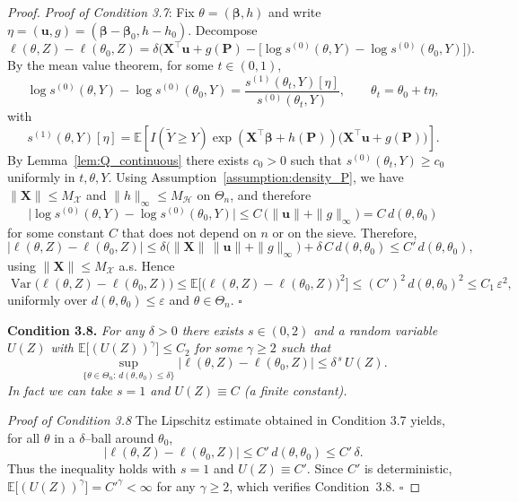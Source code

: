 \documentclass[11pt]{article}
\DeclareMathOperator{\Var}{Var}
\newcommand{\E}{\mathbb{E}}
\newenvironment{condition}[1]
  {\par\medskip\noindent\textbf{Condition #1.}\itshape}
  {\medskip}
\begin{document}
\begin{proof}
		\noindent\textit{Proof of Condition 3.7}:
		Fix $\theta=(\bm\beta,h)$ and write
		$\eta=(\bm u,g)=(\bm\beta-\bm\beta_0,h-h_0)$.
		Decompose
		\[
		\ell(\theta,Z)-\ell(\theta_0,Z)
		=\delta\Big(\bm X^\top\bm u+g(\bm P)
		-\big[\log s^{(0)}(\theta,Y)-\log s^{(0)}(\theta_0,Y)\big]\Big).
		\]
		By the mean value theorem, for some $t\in(0,1)$,
		\[
		\log s^{(0)}(\theta,Y)-\log s^{(0)}(\theta_0,Y)
		=\frac{s^{(1)}(\theta_t,Y)[\eta]}{s^{(0)}(\theta_t,Y)},
		\qquad \theta_t=\theta_0+t\eta,
		\]
		with
		\[
		s^{(1)}(\theta,Y)[\eta]
		=\E\!\left[I(\tilde Y\!\ge Y)\exp(\bm X^\top\bm\beta+h(\bm P))
		\big(\bm X^\top\bm u+g(\bm P)\big)\right].
		\]
		By Lemma~\ref{lem:Q_continuous} there exists $c_0>0$ such that
		$s^{(0)}(\theta_t,Y)\ge c_0$ uniformly in $t,\theta,Y$.
		Using Assumption~\ref{assumption:density_P}, we have $\|\bm X\|\le M_{\mathcal X}$
		and $\|h\|_\infty\le M_{\mathcal H}$ on $\Theta_n$, and therefore 	\[
		\Big|\log s^{(0)}(\theta,Y)-\log s^{(0)}(\theta_0,Y)\Big|
		\le C\,\big(\|\bm u\|+\|g\|_\infty\big)
		= C\, d(\theta,\theta_0)
		\]
		for some constant $C$ that does not depend on $n$ or on the sieve.
		Therefore,
		\[
		\big|\ell(\theta,Z)-\ell(\theta_0,Z)\big|
		\le \delta\Big(\|\bm X\|\,\|\bm u\|+\|g\|_\infty\Big)+
		\delta\,C\,d(\theta,\theta_0)
		\le C'\,d(\theta,\theta_0),
		\]
		using $\|\bm X\|\le M_{\mathcal X}$ a.s.
		Hence
		\[
		\Var\!\bigl(\ell(\theta,Z)-\ell(\theta_0,Z)\bigr)
		\le \E\bigl[\big(\ell(\theta,Z)-\ell(\theta_0,Z)\big)^2\bigr]
		\le (C')^2\, d(\theta,\theta_0)^2
		\le C_1\,\varepsilon^2 ,
		\]
		uniformly over $d(\theta,\theta_0)\le\varepsilon$ and $\theta\in\Theta_n$. \hfill $\square$
		
		
		\begin{condition}{3.8} For any $\delta>0$ there exists $s\in(0,2)$ and a random variable $U(Z)$ with $\E\big[(U(Z))^\gamma\big]\le C_2$ for some $\gamma\ge2$ such that
		\[
		\sup_{\{\theta\in\Theta_n:\, d(\theta,\theta_0)\le\delta\}}
		\big|\ell(\theta,Z)-\ell(\theta_0,Z)\big|
		\le \delta^{\,s}\, U(Z).
		\]
		In fact we can take $s=1$ and $U(Z)\equiv C$ (a finite constant).
		\end{condition}

		\noindent\textit{Proof of Condition 3.8} The Lipschitz estimate obtained in Condition 3.7 yields, for all $\theta$ in a $\delta$–ball around $\theta_0$,
		\[
		\big|\ell(\theta,Z)-\ell(\theta_0,Z)\big|
		\le C'\, d(\theta,\theta_0)
		\le C'\,\delta .
		\]
		Thus the inequality holds with $s=1$ and $U(Z)\equiv C'$.
		Since $C'$ is deterministic, $\E\big[(U(Z))^\gamma\big]=C'^\gamma<\infty$
		for any $\gamma\ge2$, which verifies Condition~3.8. \hfill $\square$
	\end{proof}
	
\end{document}
